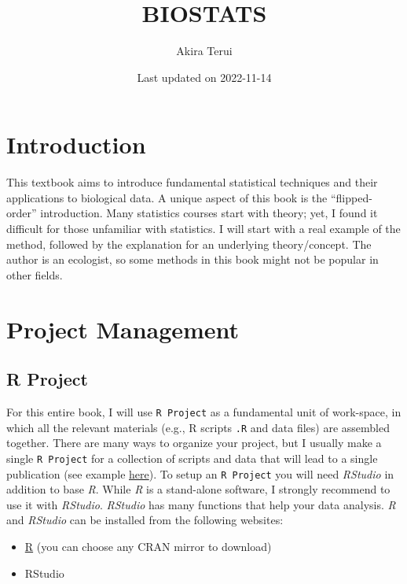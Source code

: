 \documentclass[
]{book}
\title{BIOSTATS}
\author{Akira Terui}
\date{Last updated on 2022-11-14}
\providecommand{\tightlist}{%
  \setlength{\itemsep}{0pt}\setlength{\parskip}{0pt}}
\begin{document}
\maketitle

{
\setcounter{tocdepth}{1}
\tableofcontents
}
\hypertarget{introduction}{%
\chapter*{Introduction}\label{introduction}}

This textbook aims to introduce fundamental statistical techniques and their applications to biological data. A unique aspect of this book is the ``flipped-order'' introduction. Many statistics courses start with theory; yet, I found it difficult for those unfamiliar with statistics. I will start with a real example of the method, followed by the explanation for an underlying theory/concept. The author is an ecologist, so some methods in this book might not be popular in other fields.

\hypertarget{project-management}{%
\chapter{Project Management}\label{project-management}}

\hypertarget{r-project}{%
\section{R Project}\label{r-project}}

For this entire book, I will use \texttt{R\ Project} as a fundamental unit of work-space, in which all the relevant materials (e.g., R scripts \texttt{.R} and data files) are assembled together. There are many ways to organize your project, but I usually make a single \texttt{R\ Project} for a collection of scripts and data that will lead to a single publication (see example \href{https://github.com/aterui/public-proj_stream-diversity}{here}). To setup an \texttt{R\ Project} you will need \emph{RStudio} in addition to base \emph{R}. While \emph{R} is a stand-alone software, I strongly recommend to use it with \emph{RStudio}. \emph{RStudio} has many functions that help your data analysis. \emph{R} and \emph{RStudio} can be installed from the following websites:

\begin{itemize}
\tightlist
\item
  \href{https://www.r-project.org/}{R} (you can choose any CRAN mirror to download)
\item
  RStudio
\end{itemize}
\end{document}

